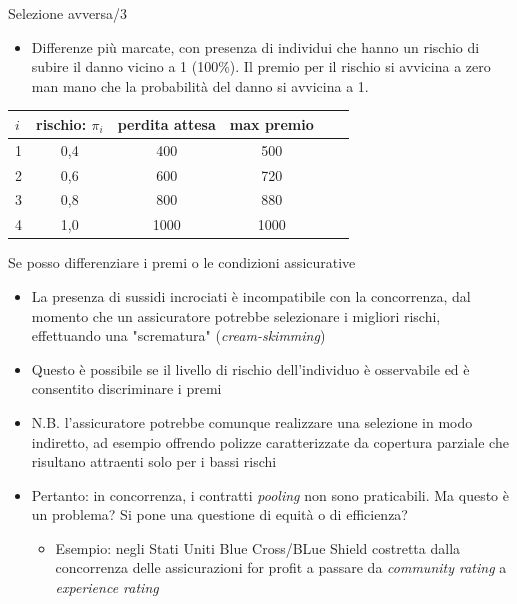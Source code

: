 \documentclass[aspectratio=64,11pt]{beamer}
\begin{document}
\begin{frame}{Selezione avversa/3}
\begin{itemize}
\item Differenze più marcate, con presenza di individui che hanno un rischio di subire il danno vicino a 1 (100\%). Il premio per il rischio si avvicina a zero man mano che la probabilità del danno si avvicina a 1.
\end{itemize}

\begin{center}
\begin{tabular}{lccccl}
  \toprule
  $i$&rischio: $\pi_i$&perdita attesa & max premio\\
  \midrule
  1 & 0,4 &400 & 500 \\
  2 & 0,6 &600 & 720 \\
  3 & 0,8 &800 & 880 \\
  4 & 1,0 &1000&1000 \\
  \bottomrule
\end{tabular}
\end{center}
\end{frame}

\begin{frame}{Se posso differenziare i premi o le condizioni assicurative}
\begin{itemize}
\item La presenza di sussidi incrociati è incompatibile con la concorrenza, dal
momento che un assicuratore potrebbe selezionare i migliori rischi,
effettuando una "scrematura" (\emph{cream-skimming})
\item Questo è possibile se il livello di rischio dell'individuo è osservabile ed
è consentito discriminare i premi
\item N.B. l'assicuratore potrebbe comunque realizzare una selezione in modo
indiretto, ad esempio offrendo polizze caratterizzate da copertura parziale
che risultano attraenti solo per i bassi rischi
\item Pertanto: in concorrenza, i contratti \emph{pooling} non sono praticabili. Ma
questo è un problema? Si pone una questione di equità o di efficienza?
\begin{itemize}
\item Esempio: negli Stati Uniti Blue Cross/BLue Shield costretta dalla
concorrenza delle assicurazioni for profit a passare da \emph{community rating}
a \emph{experience rating}
\end{itemize}
\end{itemize}
\end{frame}
\end{document}
